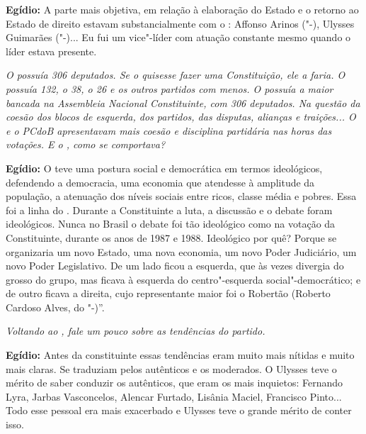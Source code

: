 \textbf{Egídio:} A parte mais objetiva, em relação à elaboração do
Estado e o retorno ao Estado de direito estavam substancialmente com o
: Affonso Arinos ("-), Ulysses Guimarães ("-)... Eu fui um
vice"-líder com atuação constante mesmo quando o líder estava presente.

\emph{O  possuía 306 deputados. Se o  quisesse fazer uma
Constituição, ele a faria. O  possuía 132, o  38, o  26 e os
outros partidos com menos. O  possuía a maior bancada na Assembleia
Nacional Constituinte, com 306 deputados. Na questão da coesão dos
blocos de esquerda, dos partidos, das disputas, alianças e traições... O
 e o PCdoB apresentavam mais coesão e disciplina partidária nas horas
das votações. E o , como se comportava?}

\textbf{Egídio:} O  teve uma postura social e democrática em termos
ideológicos, defendendo a democracia, uma economia que atendesse à
amplitude da população, a atenuação dos níveis sociais entre ricos,
classe média e pobres. Essa foi a linha do . Durante a Constituinte
a luta, a discussão e o debate foram ideológicos. Nunca no Brasil o
debate foi tão ideológico como na votação da Constituinte, durante os
anos de 1987 e 1988. Ideológico por quê? Porque se organizaria um novo
Estado, uma nova economia, um novo Poder Judiciário, um novo Poder
Legislativo. De um lado ficou a esquerda, que às vezes divergia do
grosso do grupo, mas ficava à esquerda do centro"-esquerda
social"-democrático; e de outro ficava a direita, cujo representante
maior foi o Robertão (Roberto Cardoso Alves, do "-)''.

\emph{Voltando ao , fale um pouco sobre as tendências do partido.}

\textbf{Egídio:} Antes da constituinte essas tendências eram muito mais
nítidas e muito mais claras. Se traduziam pelos autênticos e os
moderados. O Ulysses teve o mérito de saber conduzir os autênticos, que
eram os mais inquietos: Fernando Lyra, Jarbas Vasconcelos, Alencar
Furtado, Lisânia Maciel, Francisco Pinto... Todo esse pessoal era mais
exacerbado e Ulysses teve o grande mérito de conter isso.

